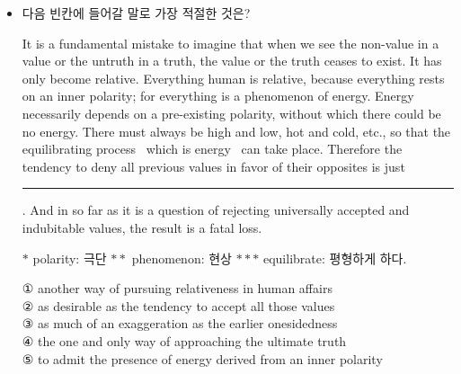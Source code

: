\documentclass[9pt, a4paper, twocolumn]{oblivoir}
\begin{document}
    \begin{itemize}[\null]
        \item 다음 빈칸에 들어갈 말로 가장 적절한 것은? %
        
        It is a fundamental mistake to imagine that when we see
the non-value in a value or the untruth in a truth, the value
or the truth ceases to exist. It has only become relative.
Everything human is relative, because everything rests on
an inner polarity; for everything is a phenomenon of energy.
Energy necessarily depends on a pre-existing polarity, without
which there could be no energy. There must always be high
and low, hot and cold, etc., so that the equilibrating
process \textemdash~which is energy \textemdash~can take place. Therefore the
tendency to deny all previous values in favor of their
opposites is just \rule{5cm}{0.1mm}. And in so
far as it is a question of rejecting universally accepted and
indubitable values, the result is a fatal loss. \\
\begin{flushright}
   {\small$*$  polarity: 극단 $**$ phenomenon: 현상 
    $***$ equilibrate: 평형하게 하다.}
\end{flushright}
{\small %
① another way of pursuing relativeness in human affairs\\
② as desirable as the tendency to accept all those values\\
③ as much of an exaggeration as the earlier onesidedness\\
④ the one and only way of approaching the ultimate truth\\
⑤ to admit the presence of energy derived from an inner polarity\\        
}
\newpage
    \end{itemize}
\end{document}
